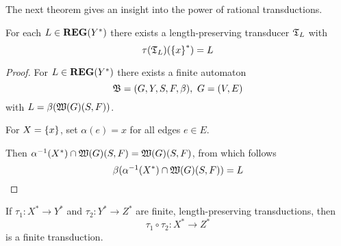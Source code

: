 The next theorem gives an insight into the power of rational transductions.

\begin{theorem}
For each $L \in \mbox{{\bf REG}}(Y^*)$ there exists a length-preserving transducer
$\mbox{$\mathfrak{T}$}_L$ with
\[ \tau(\mbox{$\mathfrak{T}$}_L)(\mbox{$\{x\}$}^*) = L \]
\end{theorem}

\begin{proof}
For $L \in \mbox{{\bf REG}}(Y^*)$ there exists a finite automaton
\[ \mbox{$\mathfrak{B}$} = (G, Y, S, F, \beta),\ G= (V, E) \]
with $L = \beta(\mbox{$\mathfrak{W}({G})$}(S, F))$. 

For $X = \mbox{$\{x\}$}$, set $\alpha(e) = x$ for all edges $e \in E$.

Then $\mbox{${\alpha}^{-1}$}(X^*) \cap \mbox{$\mathfrak{W}({G})$}(S, F) = \mbox{$\mathfrak{W}({G})$}(S, F)$, from
which follows
\[ \beta(\mbox{${\alpha}^{-1}$}(X^*) \cap \mbox{$\mathfrak{W}({G})$}(S, F)) = L \]
\end{proof}

\bigskip
\begin{theorem}
If $\tau_1 : X^* \to Y^*$ and $\tau_2 : Y^* \to Z^*$ are finite,
length-preserving transductions, then
\[ \tau_1 \circ \tau_2 : X^* \to Z^* \]
is a finite transduction.
\end{theorem}

